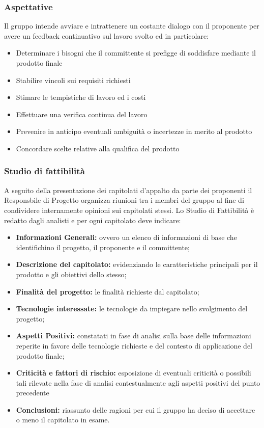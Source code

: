 \subsubsection{Aspettative}
Il gruppo intende avviare e intrattenere un costante dialogo con il proponente per avere un feedback continuativo sul lavoro svolto ed in particolare:
\begin{itemize}
\item Determinare i bisogni che il committente si prefigge di soddisfare mediante il prodotto finale
\item Stabilire vincoli sui requisiti richiesti
\item Stimare le tempistiche di lavoro ed i costi 
\item Effettuare una verifica continua del lavoro
\item Prevenire in anticipo eventuali ambiguità o incertezze in merito al prodotto
\item Concordare scelte relative alla qualifica del prodotto
\end{itemize}

\subsubsection{Studio di fattibilità}
A seguito della presentazione dei capitolati d'appalto da parte dei proponenti il Responsbile di Progetto organizza riunioni tra i membri del gruppo al fine di condividere internamente opinioni sui capitolati stessi.
Lo Studio di Fattibilità è redatto dagli analisti e per ogni capitolato deve indicare:
\begin{itemize}
\item \textbf{Informazioni Generali:} ovvero un elenco di informazioni di base che identifichino il progetto, il proponente e il committente;
\item \textbf{Descrizione del capitolato:}  evidenziando le caratteristiche principali per il prodotto e gli obiettivi dello stesso;
\item \textbf {Finalità del progetto:} le finalità richieste dal capitolato;
\item \textbf {Tecnologie interessate:} le tecnologie da impiegare nello svolgimento del progetto;
\item \textbf{Aspetti Positivi:} constatati in fase di analisi sulla base delle informazioni reperite in favore delle tecnologie richieste e del contesto di applicazione del prodotto finale;
\item \textbf{Criticità e fattori di rischio:} esposizione di eventuali criticità o possibili tali rilevate nella fase di analisi contestualmente agli aspetti positivi del punto precedente
\item \textbf{Conclusioni:} riassunto delle ragioni per cui il gruppo ha deciso di accettare o meno il capitolato in esame.
\end{itemize}

